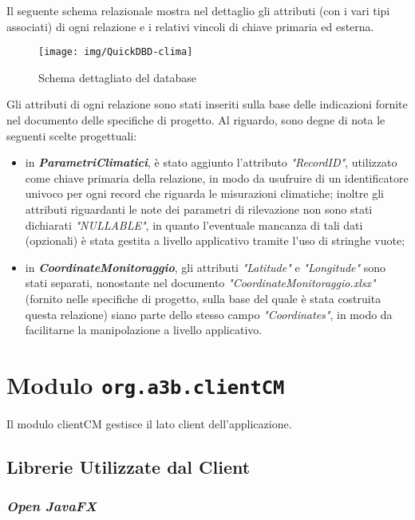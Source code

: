 Il seguente schema relazionale mostra nel dettaglio gli attributi (con i vari tipi associati) di ogni relazione e i relativi vincoli di chiave primaria ed esterna.

\begin{figure}[h]
	\centering
	\caption{Schema dettagliato del database}
	\label{fig:quickdbd-clima}
	\texttt{[image: img/QuickDBD-clima]}
\end{figure}

Gli attributi di ogni relazione sono stati inseriti sulla base delle indicazioni fornite nel documento delle specifiche di progetto. Al riguardo, sono degne di nota le seguenti scelte progettuali:
\begin{itemize}
	\item in \textit{\textbf{ParametriClimatici}}, è stato aggiunto l'attributo \textit{"RecordID"}, utilizzato come chiave primaria della relazione, in modo da usufruire di un identificatore univoco per ogni record che riguarda le misurazioni climatiche; inoltre gli attributi riguardanti le note dei parametri di rilevazione non sono stati dichiarati \textit{"NULLABLE"}, in quanto l'eventuale mancanza di tali dati (opzionali) è stata gestita a livello applicativo tramite l'uso di stringhe vuote;
	\item in \textit{\textbf{CoordinateMonitoraggio}}, gli attributi \textit{"Latitude"} e \textit{"Longitude"} sono stati separati, nonostante nel documento \textit{"CoordinateMonitoraggio.xlsx"} (fornito nelle specifiche di progetto, sulla base del quale è stata costruita questa relazione) siano parte dello stesso campo \textit{"Coordinates"}, in modo da facilitarne la manipolazione a livello applicativo.
\end{itemize}

\chapter{Modulo \texttt{org.a3b.clientCM}}
\label{ch:client}

Il modulo clientCM gestisce il lato client dell'applicazione.

\section{Librerie Utilizzate dal Client}

\subsection{\textsl{Open JavaFX}}

